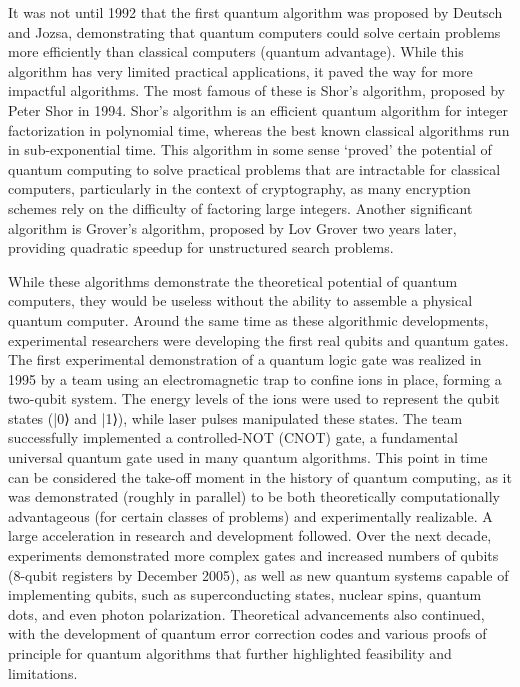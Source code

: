 \documentclass{elbioimp2}
\begin{document}
It was not until 1992 that the first quantum algorithm was proposed by Deutsch and Jozsa\cite{Deutsch1992RapidSO},
demonstrating that quantum computers could solve certain problems more efficiently than classical computers 
(quantum advantage). While this algorithm has very limited practical applications, it paved the way for more 
impactful algorithms.
The most famous of these is Shor's algorithm, proposed by Peter Shor in 1994\cite{365700}. Shor's algorithm 
is an efficient quantum algorithm for integer factorization in polynomial time, whereas the best known classical
algorithms run in sub-exponential time. This algorithm in some sense `proved' the potential of quantum computing
to solve practical problems that are intractable for classical computers, particularly in the context of cryptography, as
many encryption schemes rely on the difficulty of factoring large integers. 
Another significant algorithm is Grover's algorithm, proposed by Lov Grover two years later\cite{grover1996fastquantummechanicalalgorithm}, providing
quadratic speedup for unstructured search problems.

While these algorithms demonstrate the theoretical potential of quantum computers, they would be useless without
the ability to assemble a physical quantum computer. Around the same time as these algorithmic developments, experimental researchers were developing the first real qubits and quantum gates. The first experimental demonstration of a quantum logic gate was realized in 1995 by a team using an electromagnetic trap to confine ions in place, forming a two-qubit system. The energy levels of the ions were used to represent the qubit states (|0⟩ and |1⟩), while laser pulses manipulated these states. The team successfully implemented a controlled-NOT (CNOT) gate, a fundamental universal quantum gate used in many quantum algorithms\cite{PhysRevLett.75.4714}.
This point in time can be considered the take-off moment in the history of quantum computing, as it was demonstrated (roughly in parallel) to be both theoretically computationally advantageous (for certain classes of problems) and experimentally realizable. A large acceleration in research and development followed. Over the next decade, experiments demonstrated more complex gates and increased numbers of qubits (8-qubit registers by December 2005)\cite{8bitregister}, as well as new quantum systems capable of implementing qubits, such as superconducting states, nuclear spins, quantum dots, and even photon polarization. Theoretical advancements also continued, with the development of quantum error correction codes and various proofs of principle for quantum algorithms that further highlighted feasibility and limitations.
\end{document}
